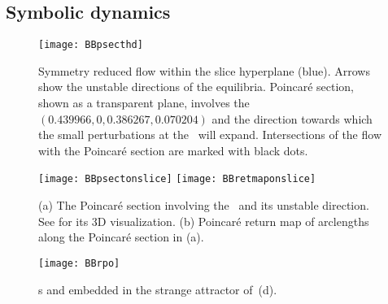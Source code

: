 \documentclass[aip,cha,
reprint,
secnumarabic,
nofootinbib, tightenlines,
nobibnotes, showkeys, showpacs,
groupedaddress,
]{revtex4-1}
\begin{document}
\subsection{Symbolic dynamics}

\begin{figure}%
\centering
 \texttt{[image: BBpsecthd]}
\caption{
Symmetry reduced flow within the slice hyperplane (blue). Arrows
show the unstable directions of the equilibria. Poincar\'e section, shown as
a transparent plane, involves the \reqv\ $(0.439966, 0, 0.386267, 0.070204)$
and the direction towards which the small perturbations at the \reqv\ will expand.
Intersections of the flow with the Poincar\'e section are marked with black dots.
}
\label{fig:BBpsecthd}
\end{figure}

\begin{figure}
\centering
  \texttt{[image: BBpsectonslice]}
  \texttt{[image: BBretmaponslice]}
\caption{(a) The Poincar\'e section involving the \reqv\ and its unstable direction.
		  See  for its 3D visualization.
		  (b) Poincar\'e return map of arclengths along the Poincar\'e section
		  in (a).}
\label{fig:psectandretmap}
\end{figure}



\begin{figure}%
  \begin{center}
  \texttt{[image: BBrpo]}
  \end{center}
  \caption{
	\Rpo s  and  embedded in the strange attractor
    of \,(d).
    }
  \label{fig:BBrpo1-01}
\end{figure}
\end{document}
